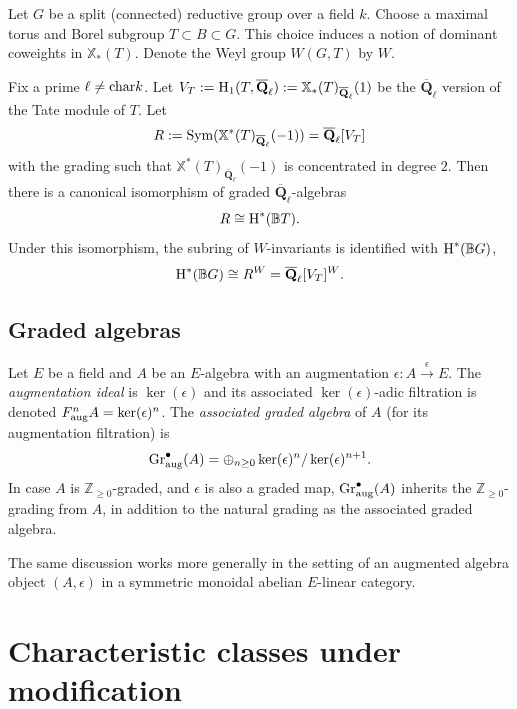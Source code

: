 \documentclass[reqno]{amsart}
\numberwithin{equation}{subsection}
\theoremstyle{definition}
\def\BB{\mathbb{B}}
\def\ZZ{\mathbb{Z}}
\newcommand{\ch}{\textup{char}}
\newcommand{\Gr}{\textup{Gr}}
\newcommand\Sym{\textup{Sym}}
\newcommand\xch{\mathbb{X}^*}
\newcommand\xcoch{\mathbb{X}_*}
\newcommand{\Qlbar}{\overline{\Q}_\ell}
\newcommand{\bu}{\bullet}
\newcommand\op{\oplus}
\newcommand{\homog}[2]{\textup{H}_{#1}({#2})}  %
\newcommand{\cohog}[2]{\textup{H}^{#1}({#2})}     %
\newcommand\xr{\xrightarrow}
\newcommand{\e}{\epsilon}
\newcommand\aug{\textup{aug}}
\newcommand{\Q}{\mathbf{Q}}
\begin{document}
Let $G$ be a split (connected) reductive group over a field $k$. Choose a maximal torus and Borel subgroup $T\subset B\subset G$. This choice induces a notion of dominant coweights in $\xcoch(T)$. Denote the Weyl group $W(G,T)$ by $W$.

Fix a prime $\ell \neq \ch{k}$. Let $V_{T}:=\homog{1}{T,\Qlbar}:=\xcoch(T)_{\Qlbar}(1)$ be the $\Qlbar$ version of the Tate module of $T$. 
Let
\begin{equation*}
R := \Sym(\xch(T)_{\Qlbar}(-1))=\Qlbar[V_{T}]
\end{equation*}
with the grading such that $\xch(T)_{\Qlbar}(-1)$ is concentrated in degree $2$. Then there is a  canonical isomorphism of graded $\Qlbar$-algebras
\begin{equation*}
R\cong \cohog{*}{\BB T}.
\end{equation*}
Under this isomorphism, the subring of $W$-invariants is identified with $\cohog{*}{\BB G}$,
\begin{equation}\label{coho BG}
\cohog{*}{\BB G}\cong R^W =\Qlbar[V_{T}]^{W}.
\end{equation}

\subsection{Graded algebras}\label{sss:aug gr} Let $E$ be a field and  $A$ be an $E$-algebra with an augmentation $\e: A\xr{\e}E$. The \emph{augmentation ideal} is $\ker(\e)$ and its associated $\ker(\e)$-adic filtration is denoted $F_{\aug}^{n}A=\ker(\e)^{n}$. The \emph{associated graded algebra} of $A$ (for its augmentation filtration) is  
\begin{equation*}
\Gr^{\bu}_{\aug}(A)=\op_{n\ge0}\ker(\e)^{n}/\ker(\e)^{n+1}.
\end{equation*}
In case $A$ is $\ZZ_{\ge0}$-graded, and $\e$ is also a graded map, $\Gr^{\bu}_{\aug}(A)$ inherits the $\ZZ_{\ge0}$-grading from $A$, in addition to the natural grading as the associated graded algebra.


The same discussion works more generally in the setting of an augmented algebra object $(A,\e)$ in a symmetric monoidal abelian $E$-linear category. 



\section{Characteristic classes under modification}\label{s:char class under mod}
\end{document}
